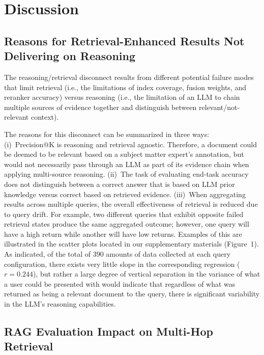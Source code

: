 \documentclass[11pt,a4paper]{article}
\begin{document}

\section{Discussion}
\label{sec:discussion}

\subsection{Reasons for Retrieval-Enhanced Results Not Delivering on Reasoning}

The reasoning/retrieval disconnect results from different potential
failure modes that limit retrieval (i.e., the limitations of index
coverage, fusion weights, and reranker accuracy) versus reasoning
(i.e., the limitation of an LLM to chain multiple sources of evidence
together and distinguish between relevant/not-relevant context).

The reasons for this disconnect can be summarized in three ways:
(i)~Precision@K is reasoning and retrieval agnostic.
Therefore, a document could be deemed to be relevant based on a
subject matter expert's annotation, but would not necessarily pass
through an LLM as part of its evidence chain when applying
multi-source reasoning.
(ii)~The task of evaluating end-task accuracy does not distinguish
between a correct answer that is based on LLM prior knowledge versus
correct based on retrieved evidence.
(iii)~When aggregating results across multiple queries, the overall
effectiveness of retrieval is reduced due to query drift.
For example, two different queries that exhibit opposite failed
retrieval states produce the same aggregated outcome; however, one
query will have a high return while another will have low returns.
Examples of this are illustrated in the scatter plots located in our
supplementary materials (Figure~1).
As indicated, of the total of 390 amounts of data collected at each
query configuration, there exists very little slope in the
corresponding regression ($r{=}0.244$), but rather a large degree of
vertical separation in the variance of what a user could be presented
with would indicate that regardless of what was returned as being a
relevant document to the query, there is significant variability in
the LLM's reasoning capabilities.

\subsection{RAG Evaluation Impact on Multi-Hop Retrieval}
\end{document}
